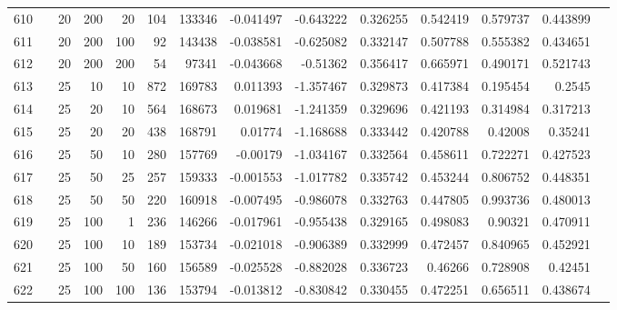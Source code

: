\begin{longtable}{llrrrrrrrrrrrr}
		610 & &           20 &               200 &           20 &         104 &     133346 & -0.041497 & -0.643222 &  0.326255 &    0.542419 &       0.579737 &  0.443899 \\
		611 & &           20 &               200 &          100 &          92 &     143438 & -0.038581 & -0.625082 &  0.332147 &    0.507788 &       0.555382 &  0.434651 \\
		612 & &           20 &               200 &          200 &          54 &      97341 & -0.043668 &  -0.51362 &  0.356417 &    0.665971 &       0.490171 &  0.521743 \\
		613 & &           25 &                10 &           10 &         872 &     169783 &  0.011393 & -1.357467 &  0.329873 &    0.417384 &       0.195454 &    0.2545 \\
		614 & &           25 &                20 &           10 &         564 &     168673 &  0.019681 & -1.241359 &  0.329696 &    0.421193 &       0.314984 &  0.317213 \\
		615 & &           25 &                20 &           20 &         438 &     168791 &   0.01774 & -1.168688 &  0.333442 &    0.420788 &        0.42008 &   0.35241 \\
		616 & &           25 &                50 &           10 &         280 &     157769 &  -0.00179 & -1.034167 &  0.332564 &    0.458611 &       0.722271 &  0.427523 \\
		617 & &           25 &                50 &           25 &         257 &     159333 & -0.001553 & -1.017782 &  0.335742 &    0.453244 &       0.806752 &  0.448351 \\
		618 & &           25 &                50 &           50 &         220 &     160918 & -0.007495 & -0.986078 &  0.332763 &    0.447805 &       0.993736 &  0.480013 \\
		619 & &           25 &               100 &            1 &         236 &     146266 & -0.017961 & -0.955438 &  0.329165 &    0.498083 &        0.90321 &  0.470911 \\
		620 & &           25 &               100 &           10 &         189 &     153734 & -0.021018 & -0.906389 &  0.332999 &    0.472457 &       0.840965 &  0.452921 \\
		621 & &           25 &               100 &           50 &         160 &     156589 & -0.025528 & -0.882028 &  0.336723 &     0.46266 &       0.728908 &   0.42451 \\
		622 & &           25 &               100 &          100 &         136 &     153794 & -0.013812 & -0.830842 &  0.330455 &    0.472251 &       0.656511 &  0.438674 \\

\end{longtable}

